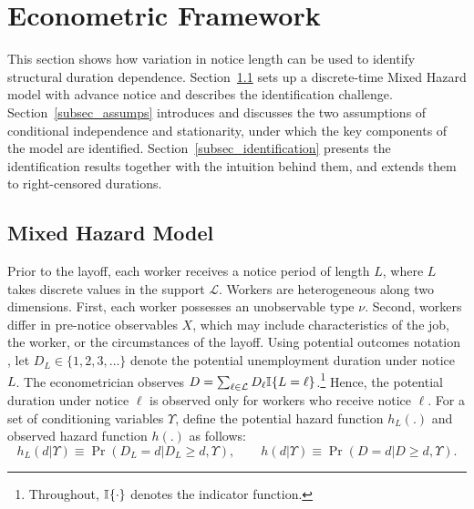 \documentclass{div}
\begin{document}
\section{Econometric Framework}\label{sec_ef}

This section shows how variation in notice length can be used to identify structural duration dependence. Section~\ref{subsec_hazard_model} sets up a discrete-time Mixed Hazard model with advance notice and describes the identification challenge. Section~\ref{subsec_assumps} introduces and discusses the two assumptions of conditional independence and stationarity, under which the key components of the model are identified. Section~\ref{subsec_identification} presents the identification results together with the intuition behind them, and extends them to right-censored durations. 


\subsection{Mixed Hazard Model}\label{subsec_hazard_model}


Prior to the layoff, each worker receives a notice period of length \( L \), where \( L \) takes discrete values in the support $\mathcal{L}$. Workers are heterogeneous along two dimensions. First, each worker possesses an unobservable type \( \nu \). Second, workers differ in pre-notice observables \( X \), which may include characteristics of the job, the worker, or the circumstances of the layoff. Using potential outcomes notation \citep{Rubin1974}, let \(D_L \in \{1, 2, 3, \ldots\}\) denote the potential unemployment duration under notice \(L\). The econometrician observes $D = \sum_{\ell \in \mathcal{L}} D_{\ell}  \I\{L=\ell\}$.\footnote{Throughout, \(\I\{\cdot\}\) denotes the indicator function.} Hence, the potential duration under notice $\ell$ is observed only for workers who receive notice $\ell$. For a set of conditioning variables $\Upsilon$, define the potential hazard function \( h_L(.) \) and observed hazard function \( h(.) \) as follows:
\[h_L(d|\Upsilon)\equiv\Pr(D_L=d|D_L \geq d, \Upsilon), \qquad h(d|\Upsilon)\equiv\Pr(D=d|D \geq d, \Upsilon).\]
\end{document}

